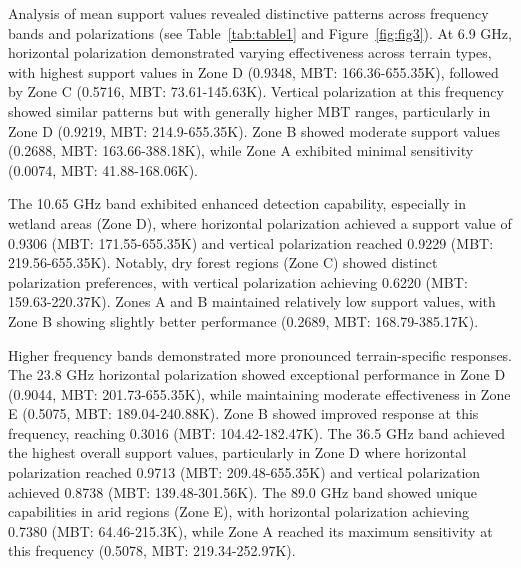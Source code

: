 \documentclass[fleqn,10pt]{wlscirep_mdpi_style}
\begin{document}
Analysis of mean support values revealed distinctive patterns across frequency bands and polarizations (see Table~\ref{tab:table1} and Figure~\ref{fig:fig3}). At 6.9 GHz, horizontal polarization demonstrated varying effectiveness across terrain types, with highest support values in Zone D (0.9348, MBT: 166.36-655.35K), followed by Zone C (0.5716, MBT: 73.61-145.63K). Vertical polarization at this frequency showed similar patterns but with generally higher MBT ranges, particularly in Zone D (0.9219, MBT: 214.9-655.35K). Zone B showed moderate support values (0.2688, MBT: 163.66-388.18K), while Zone A exhibited minimal sensitivity (0.0074, MBT: 41.88-168.06K).

The 10.65 GHz band exhibited enhanced detection capability, especially in wetland areas (Zone D), where horizontal polarization achieved a support value of 0.9306 (MBT: 171.55-655.35K) and vertical polarization reached 0.9229 (MBT: 219.56-655.35K). Notably, dry forest regions (Zone C) showed distinct polarization preferences, with vertical polarization achieving 0.6220 (MBT: 159.63-220.37K). Zones A and B maintained relatively low support values, with Zone B showing slightly better performance (0.2689, MBT: 168.79-385.17K).

Higher frequency bands demonstrated more pronounced terrain-specific responses. The 23.8 GHz horizontal polarization showed exceptional performance in Zone D (0.9044, MBT: 201.73-655.35K), while maintaining moderate effectiveness in Zone E (0.5075, MBT: 189.04-240.88K). Zone B showed improved response at this frequency, reaching 0.3016 (MBT: 104.42-182.47K). The 36.5 GHz band achieved the highest overall support values, particularly in Zone D where horizontal polarization reached 0.9713 (MBT: 209.48-655.35K) and vertical polarization achieved 0.8738 (MBT: 139.48-301.56K). The 89.0 GHz band showed unique capabilities in arid regions (Zone E), with horizontal polarization achieving 0.7380 (MBT: 64.46-215.3K), while Zone A reached its maximum sensitivity at this frequency (0.5078, MBT: 219.34-252.97K).
\end{document}
